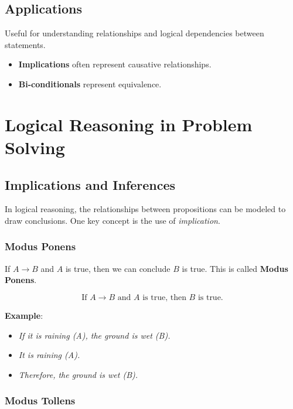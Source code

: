 \documentclass{article}
\begin{document}
\subsection{Applications}
Useful for understanding relationships and logical dependencies between statements. 
\begin{itemize}
    \item \textbf{Implications} often represent causative relationships.
    \item \textbf{Bi-conditionals} represent equivalence.
\end{itemize}

\section{Logical Reasoning in Problem Solving}

\subsection{Implications and Inferences}

In logical reasoning, the relationships between propositions can be modeled to draw conclusions. One key concept is the use of \textit{implication}.

\subsubsection{Modus Ponens}

If $A \rightarrow B$ and $A$ is true, then we can conclude $B$ is true. This is called \textbf{Modus Ponens}.

\[
\text{If } A \rightarrow B \text{ and } A \text{ is true, then } B \text{ is true.}
\]

\textbf{Example}:
\begin{itemize}
    \item \textit{If it is raining (A), the ground is wet (B).}
    \item \textit{It is raining (A).}
    \item \textit{Therefore, the ground is wet (B).}
\end{itemize}

\subsubsection{Modus Tollens}
\end{document}

